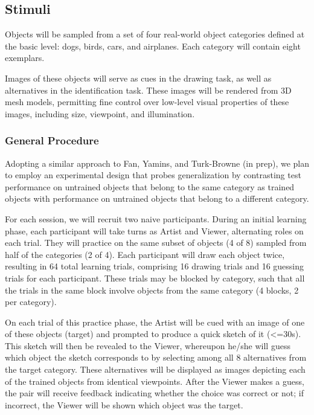 \documentclass[12pt]{article}
\begin{document}

\subsection{Stimuli}

Objects will be sampled from a set of four real-world object categories defined at the basic level: dogs, birds, cars, and airplanes. Each category will contain eight exemplars. 

Images of these objects will serve as cues in the drawing task, as well as alternatives in the identification task. These images will be rendered from 3D mesh models, permitting fine control over low-level visual properties of these images, including size, viewpoint, and illumination. 

\subsubsection{General Procedure}

Adopting a similar approach to Fan, Yamins, and Turk-Browne (in prep), we plan to employ an experimental design that probes generalization by contrasting test performance on untrained objects that belong to the same category as trained objects with performance on untrained objects that belong to a different category. 

For each session, we will recruit two naive participants. During an initial learning phase, each participant will take turns as Artist and Viewer, alternating roles on each trial. They will practice on the same subset of objects (4 of 8) sampled from half of the categories (2 of 4). Each participant will draw each object twice, resulting in 64 total learning trials, comprising 16 drawing trials and 16 guessing trials for each participant. These trials may be blocked by category, such that all the trials in the same block involve objects from the same category (4 blocks, 2 per category). 

On each trial of this practice phase, the Artist will be cued with an image of one of these objects (target) and prompted to produce a quick sketch of it (<=30s). This sketch will then be revealed to the Viewer, whereupon he/she will guess which object the sketch corresponds to by selecting among all 8 alternatives from the target category. These alternatives will be displayed as images depicting each of the trained objects from identical viewpoints. After the Viewer makes a guess, the pair will receive feedback indicating whether the choice was correct or not; if incorrect, the Viewer will be shown which object was the target. 
\end{document}
